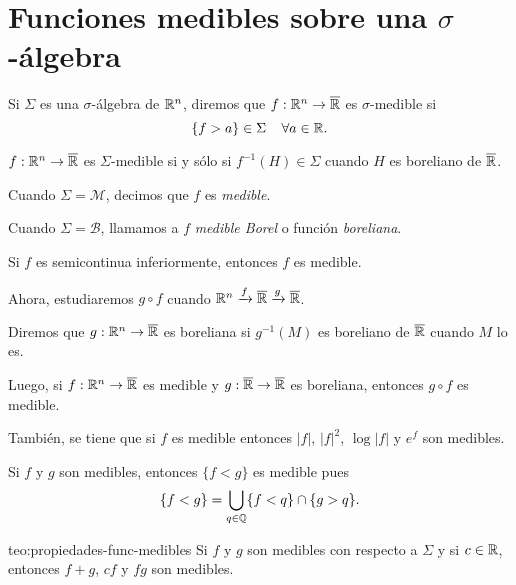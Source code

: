 \section{Funciones medibles sobre una $\sigma$-\'algebra}

\begin{definicion}{}
Si $\Sigma$ es una $\sigma$-\'algebra de $\mathbb{R}^n$, diremos que $f:\mathbb{R}^n\to \overline{\mathbb{R}}$ es $\sigma$-medible si 
\[\{f>a\} \in \Sigma\;\;\;\;\forall a \in \mathbb{R}.\]
\end{definicion}

\begin{proposicion}{}
$f:\mathbb{R}^n \to \overline{\mathbb{R}}$ es $\Sigma$-medible si y s\'olo si
$f^{-1}(H)\in \Sigma$ cuando $H$ es boreliano de $\overline{\mathbb{R}}$.
\end{proposicion}

Cuando $\Sigma=\mathcal{M}$, decimos que $f$ es \emph{medible}.

Cuando $\Sigma=\mathscr{B}$, llamamos a $f$ \emph{medible Borel} 
o funci\'on \emph{boreliana}.

\begin{ejercicio}{}
Si $f$ es semicontinua inferiormente, entonces $f$ es medible. 
\end{ejercicio}

Ahora, estudiaremos $g\circ f$ cuando 
$\mathbb{R}^n \xrightarrow{f}\overline{\mathbb{R}} \xrightarrow {g} \overline{\mathbb{R}}$.

\begin{definicion}{}
Diremos que $g: \mathbb{R}^n \to \overline{\mathbb{R}}$ es boreliana si $g^{-1}(M)$ es boreliano de $\overline{\mathbb{R}}$ cuando $M$ lo es.
\end{definicion}

Luego, si $f:\mathbb{R}^n \to \overline{\mathbb{R}}$ es medible y $g:\overline{\mathbb{R}} \to \overline{\mathbb{R}}$ es boreliana, entonces $g\circ f$ es medible.

Tambi\'en, se tiene que si $f$ es medible entonces $|f|$, $|f|^2$, $\log|f|$ y $e^f$ son medibles. 

Si $f$ y $g$ son medibles, entonces $\{f<g\}$ es medible pues
\[
\{f<g\}=\bigcup\limits_{q \in \mathbb{Q}} \{ f<q\} \cap \{ g>q\}.
\]
\begin{teorema}{teo:propiedades-func-medibles}
Si $f$ y $g$ son medibles con respecto a $\Sigma$ y si $c\in \mathbb{R}$, entonces
$f+g$, $cf$ y $fg$ son medibles.
\end{teorema}

